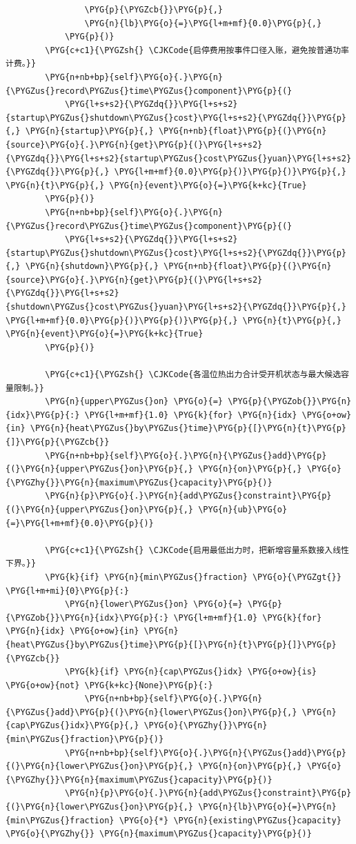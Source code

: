 \begin{Verbatim}
                \PYG{p}{\PYGZcb{}}\PYG{p}{,}
                \PYG{n}{lb}\PYG{o}{=}\PYG{l+m+mf}{0.0}\PYG{p}{,}
            \PYG{p}{)}
        \PYG{c+c1}{\PYGZsh{} \CJKCode{启停费用按事件口径入账，避免按普通功率计费。}}
        \PYG{n+nb+bp}{self}\PYG{o}{.}\PYG{n}{\PYGZus{}record\PYGZus{}time\PYGZus{}component}\PYG{p}{(}
            \PYG{l+s+s2}{\PYGZdq{}}\PYG{l+s+s2}{startup\PYGZus{}shutdown\PYGZus{}cost}\PYG{l+s+s2}{\PYGZdq{}}\PYG{p}{,} \PYG{n}{startup}\PYG{p}{,} \PYG{n+nb}{float}\PYG{p}{(}\PYG{n}{source}\PYG{o}{.}\PYG{n}{get}\PYG{p}{(}\PYG{l+s+s2}{\PYGZdq{}}\PYG{l+s+s2}{startup\PYGZus{}cost\PYGZus{}yuan}\PYG{l+s+s2}{\PYGZdq{}}\PYG{p}{,} \PYG{l+m+mf}{0.0}\PYG{p}{)}\PYG{p}{)}\PYG{p}{,} \PYG{n}{t}\PYG{p}{,} \PYG{n}{event}\PYG{o}{=}\PYG{k+kc}{True}
        \PYG{p}{)}
        \PYG{n+nb+bp}{self}\PYG{o}{.}\PYG{n}{\PYGZus{}record\PYGZus{}time\PYGZus{}component}\PYG{p}{(}
            \PYG{l+s+s2}{\PYGZdq{}}\PYG{l+s+s2}{startup\PYGZus{}shutdown\PYGZus{}cost}\PYG{l+s+s2}{\PYGZdq{}}\PYG{p}{,} \PYG{n}{shutdown}\PYG{p}{,} \PYG{n+nb}{float}\PYG{p}{(}\PYG{n}{source}\PYG{o}{.}\PYG{n}{get}\PYG{p}{(}\PYG{l+s+s2}{\PYGZdq{}}\PYG{l+s+s2}{shutdown\PYGZus{}cost\PYGZus{}yuan}\PYG{l+s+s2}{\PYGZdq{}}\PYG{p}{,} \PYG{l+m+mf}{0.0}\PYG{p}{)}\PYG{p}{)}\PYG{p}{,} \PYG{n}{t}\PYG{p}{,} \PYG{n}{event}\PYG{o}{=}\PYG{k+kc}{True}
        \PYG{p}{)}

        \PYG{c+c1}{\PYGZsh{} \CJKCode{各温位热出力合计受开机状态与最大候选容量限制。}}
        \PYG{n}{upper\PYGZus{}on} \PYG{o}{=} \PYG{p}{\PYGZob{}}\PYG{n}{idx}\PYG{p}{:} \PYG{l+m+mf}{1.0} \PYG{k}{for} \PYG{n}{idx} \PYG{o+ow}{in} \PYG{n}{heat\PYGZus{}by\PYGZus{}time}\PYG{p}{[}\PYG{n}{t}\PYG{p}{]}\PYG{p}{\PYGZcb{}}
        \PYG{n+nb+bp}{self}\PYG{o}{.}\PYG{n}{\PYGZus{}add}\PYG{p}{(}\PYG{n}{upper\PYGZus{}on}\PYG{p}{,} \PYG{n}{on}\PYG{p}{,} \PYG{o}{\PYGZhy{}}\PYG{n}{maximum\PYGZus{}capacity}\PYG{p}{)}
        \PYG{n}{p}\PYG{o}{.}\PYG{n}{add\PYGZus{}constraint}\PYG{p}{(}\PYG{n}{upper\PYGZus{}on}\PYG{p}{,} \PYG{n}{ub}\PYG{o}{=}\PYG{l+m+mf}{0.0}\PYG{p}{)}

        \PYG{c+c1}{\PYGZsh{} \CJKCode{启用最低出力时，把新增容量系数接入线性下界。}}
        \PYG{k}{if} \PYG{n}{min\PYGZus{}fraction} \PYG{o}{\PYGZgt{}} \PYG{l+m+mi}{0}\PYG{p}{:}
            \PYG{n}{lower\PYGZus{}on} \PYG{o}{=} \PYG{p}{\PYGZob{}}\PYG{n}{idx}\PYG{p}{:} \PYG{l+m+mf}{1.0} \PYG{k}{for} \PYG{n}{idx} \PYG{o+ow}{in} \PYG{n}{heat\PYGZus{}by\PYGZus{}time}\PYG{p}{[}\PYG{n}{t}\PYG{p}{]}\PYG{p}{\PYGZcb{}}
            \PYG{k}{if} \PYG{n}{cap\PYGZus{}idx} \PYG{o+ow}{is} \PYG{o+ow}{not} \PYG{k+kc}{None}\PYG{p}{:}
                \PYG{n+nb+bp}{self}\PYG{o}{.}\PYG{n}{\PYGZus{}add}\PYG{p}{(}\PYG{n}{lower\PYGZus{}on}\PYG{p}{,} \PYG{n}{cap\PYGZus{}idx}\PYG{p}{,} \PYG{o}{\PYGZhy{}}\PYG{n}{min\PYGZus{}fraction}\PYG{p}{)}
            \PYG{n+nb+bp}{self}\PYG{o}{.}\PYG{n}{\PYGZus{}add}\PYG{p}{(}\PYG{n}{lower\PYGZus{}on}\PYG{p}{,} \PYG{n}{on}\PYG{p}{,} \PYG{o}{\PYGZhy{}}\PYG{n}{maximum\PYGZus{}capacity}\PYG{p}{)}
            \PYG{n}{p}\PYG{o}{.}\PYG{n}{add\PYGZus{}constraint}\PYG{p}{(}\PYG{n}{lower\PYGZus{}on}\PYG{p}{,} \PYG{n}{lb}\PYG{o}{=}\PYG{n}{min\PYGZus{}fraction} \PYG{o}{*} \PYG{n}{existing\PYGZus{}capacity} \PYG{o}{\PYGZhy{}} \PYG{n}{maximum\PYGZus{}capacity}\PYG{p}{)}


\end{Verbatim}
